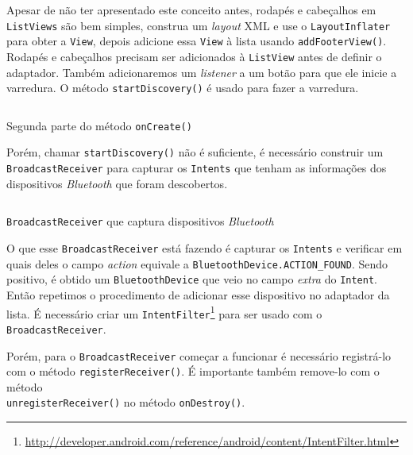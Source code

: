 \documentclass[a4paper,12pt,brazil,oneside]{book}
\begin{document}
\begin{singlespace}
	Apesar de não ter apresentado este conceito antes, rodapés e cabeçalhos em \texttt{ListViews} são bem simples, construa um \emph{layout} XML e use o \texttt{LayoutInflater} para obter a \texttt{View}, depois adicione essa \texttt{View} à lista usando \texttt{addFooterView()}. Rodapés e cabeçalhos precisam ser adicionados à \texttt{ListView} antes de definir o adaptador. Também adicionaremos um \emph{listener} a um botão para que ele inicie a varredura. O método \texttt{startDiscovery()} é usado para fazer a varredura.

	\begin{listing}[H]
	\inputminted[linenos=true,fontsize=\small,frame=lines, framesep=2mm, tabsize=2,numbersep=5pt]{java}{src/api/bluetooth/oncreate2.java}
	\caption{Segunda parte do método \texttt{onCreate()}}
	\label{code:bluetooth-oncreate2}
	\end{listing} 			

	Porém, chamar \texttt{startDiscovery()} não é suficiente, é necessário construir um \\ \texttt{BroadcastReceiver} para capturar os \texttt{Intents} que tenham as informações dos dispositivos \emph{Bluetooth} que foram descobertos.

	\begin{listing}[H]
	\inputminted[linenos=true,fontsize=\small,frame=lines, framesep=2mm, tabsize=2,numbersep=5pt]{java}{src/api/bluetooth/broadcast.java}
	\caption{\texttt{BroadcastReceiver} que captura dispositivos \emph{Bluetooth}}
	\label{code:bluetooth-broadcastreceiver}
	\end{listing} 			

	O que esse \texttt{BroadcastReceiver} está fazendo é capturar os \texttt{Intents} e verificar em quais deles o campo \emph{action} equivale a \texttt{BluetoothDevice.ACTION\_FOUND}. Sendo positivo, é obtido um \texttt{BluetoothDevice} que veio no campo \emph{extra} do \texttt{Intent}. Então repetimos o procedimento de adicionar esse dispositivo no adaptador da lista. É necessário criar um \texttt{IntentFilter}\footnote{\href{http://developer.android.com/reference/android/content/IntentFilter.html}{http://developer.android.com/reference/android/content/IntentFilter.html}} para ser usado com o \texttt{BroadcastReceiver}.

	Porém, para o \texttt{BroadcastReceiver} começar a funcionar é necessário registrá-lo com o método \texttt{registerReceiver()}. É importante também remove-lo com o método \\ \texttt{unregisterReceiver()} no método \texttt{onDestroy()}.


\end{singlespace}
\end{document}

